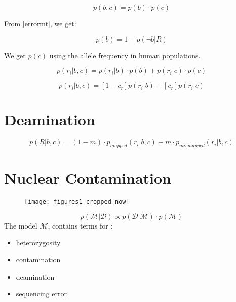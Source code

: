 \documentclass[a4paper,12pt]{article}
\begin{document}
\begin{equation}
p(b,c) = p(b) \cdot p(c)
\end{equation}

From \ref{errormt}, we get:

\begin{equation}
p(b)  = 1 - p(\neg b|R)
\end{equation}

We get $p(c)$ using the allele frequency in human populations.



\begin{equation}
p(r_i|b,c)  =  p(r_i|b) \cdot p(b)  +  p(r_i|c) \cdot p(c) 
\end{equation}


\begin{equation}
p(r_i|b,c)  =  [1-c_r] p(r_i|b) +  [c_r] p(r_i|c)
\end{equation}




\clearpage
\section{Deamination}


\begin{equation}
p(R|b,c)  = (1-m) \cdot p_{mapped}(r_i|b,c) + m \cdot p_{mismapped}(r_i|b,c)  %
\end{equation}


\section{Nuclear Contamination}

\begin{figure}
  \begin{center}
    \texttt{[image: figures1\_cropped\_now]}  
  \end{center}
  \caption{}\label{fig1}
\end{figure}


\begin{equation}
p(\mathcal{M} | \mathcal{D}   ) \propto  p(\mathcal{D}  | \mathcal{M} ) \cdot p(\mathcal{M} )
\end{equation}
The model $\mathcal{M}$, contains terms for :
\begin{itemize}
\item heterozygosity
\item  contamination
\item  deamination
\item sequencing error
\end{itemize}
\end{document}
